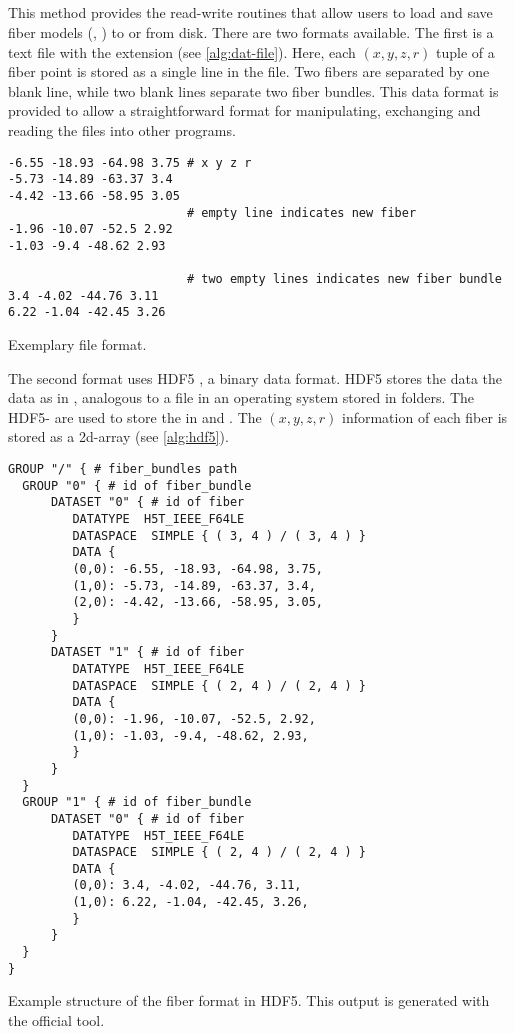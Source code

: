 \subsection{}
%
This method provides the read-write routines that allow users to load and save fiber models (\ie{}, ) to or from disk.
There are two formats available.
The first is a text file with the extension  (see \cref{alg:dat-file}).
Here, each $(x,y,z,r)$ tuple of a fiber point is stored as a single line in the file.
Two fibers are separated by one blank line, while two blank lines separate two fiber bundles.
This data format is provided to allow a straightforward  format for manipulating, exchanging and reading the files into other programs.
\par
%
\begin{lstfloat}[!ht]
\begin{lstlisting}
-6.55 -18.93 -64.98 3.75 # x y z r
-5.73 -14.89 -63.37 3.4
-4.42 -13.66 -58.95 3.05
                         # empty line indicates new fiber
-1.96 -10.07 -52.5 2.92
-1.03 -9.4 -48.62 2.93

                         # two empty lines indicates new fiber bundle
3.4 -4.02 -44.76 3.11
6.22 -1.04 -42.45 3.26
\end{lstlisting}
\caption{Exemplary  file format.}\label{alg:dat-file}
\end{lstfloat}
%
The second format uses \ac{HDF5} \cite{hdf5}, a binary data format.
\ac{HDF5} stores the data the data as  in , analogous to a file in an operating system stored in folders.
The \ac{HDF5}- are used to store the  in  and .
The $(x,y,z,r)$ information of each fiber is stored as a 2d-array (see \cref{alg:hdf5}).
%
\begin{lstfloat}[!ht]
\begin{lstlisting}
GROUP "/" { # fiber_bundles path
  GROUP "0" { # id of fiber_bundle
      DATASET "0" { # id of fiber
         DATATYPE  H5T_IEEE_F64LE
         DATASPACE  SIMPLE { ( 3, 4 ) / ( 3, 4 ) }
         DATA {
         (0,0): -6.55, -18.93, -64.98, 3.75,
         (1,0): -5.73, -14.89, -63.37, 3.4,
         (2,0): -4.42, -13.66, -58.95, 3.05,
         }
      }
      DATASET "1" { # id of fiber
         DATATYPE  H5T_IEEE_F64LE
         DATASPACE  SIMPLE { ( 2, 4 ) / ( 2, 4 ) }
         DATA {
         (0,0): -1.96, -10.07, -52.5, 2.92,
         (1,0): -1.03, -9.4, -48.62, 2.93,
         }
      }
  }
  GROUP "1" { # id of fiber_bundle
      DATASET "0" { # id of fiber
         DATATYPE  H5T_IEEE_F64LE
         DATASPACE  SIMPLE { ( 2, 4 ) / ( 2, 4 ) }
         DATA {
         (0,0): 3.4, -4.02, -44.76, 3.11,
         (1,0): 6.22, -1.04, -42.45, 3.26,
         }
      }
  }
}
\end{lstlisting}
\caption{Example structure of the fiber format in \ac{HDF5}. This output is generated with the official  tool.}
\label{alg:hdf5}
\end{lstfloat}
%
%
%
